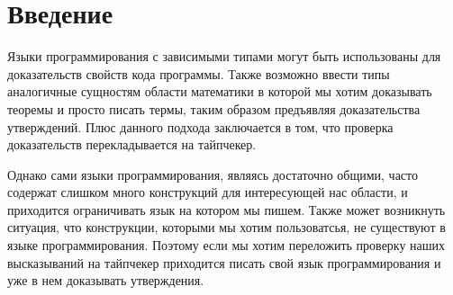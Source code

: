 \documentclass{spbau-diploma}
\begin{document}
\maketitle
\tableofcontents
\section*{Введение}
Языки программирования с зависимыми типами могут быть использованы для доказательств свойств кода программы. Также возможно ввести типы аналогичные сущностям области математики в которой мы хотим доказывать теоремы и просто писать термы, таким образом предъявляя доказательства утверждений. Плюс данного подхода заключается в том, что проверка доказательств перекладывается на тайпчекер.

Однако сами языки программирования, являясь достаточно общими, часто содержат слишком много конструкций для интересующей нас области, и приходится ограничивать язык на котором мы пишем. Также может возникнуть ситуация, что конструкции, которыми мы хотим пользоватсья, не существуют в языке программирования. Поэтому если мы хотим переложить проверку наших высказываний на тайпчекер приходится писать свой язык программирования и уже в нем доказывать утверждения.
\end{document}
